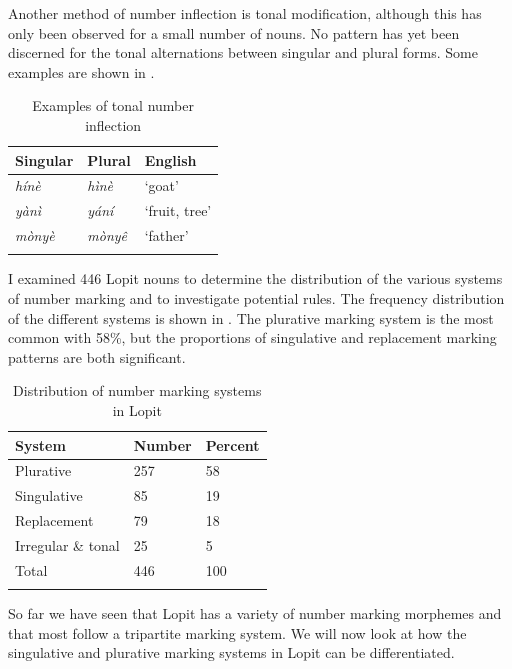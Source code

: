 \documentclass[output=paper]{langsci/langscibook}
\begin{document}
Another method of number inflection is tonal modification, although this has only been observed for a small number of nouns. No pattern has yet been discerned for the tonal alternations between singular and plural forms. Some examples are shown in .

\begin{table}
\begin{tabularx}{\textwidth}{XXX}
\lsptoprule

\mdseries \textbf{Singular} & \mdseries \textbf{Plural} & \mdseries \textbf{English}\\
\midrule
\itshape h\'{i}n\`{e} & \itshape h\`{i}n\`{e} & \mdseries ‘goat’\\
\itshape y\`{a}n\`{i} & \itshape y\'{a}n\'{i} & \mdseries ‘fruit, tree’\\
\itshape m\`{o}ny\`{e} & \itshape m\`{o}ny\^{e} & \mdseries ‘father’\\
\lspbottomrule
\end{tabularx}
\caption{Examples of tonal number inflection}
\label{tab:moodie:4}
\end{table}

I examined 446 Lopit nouns to determine the distribution of the various systems of number marking and to investigate potential rules. The frequency distribution of the different systems is shown in . The plurative marking system is the most common with 58\%, but the proportions of singulative and replacement marking patterns are both significant. 

\begin{table}
\begin{tabularx}{\textwidth}{XXX}
\lsptoprule

\mdseries \textbf{System } & \mdseries \textbf{Number} & \mdseries \textbf{Percent}\\ \midrule
Plurative & 257 & 58\\
Singulative & 85 & 19\\
Replacement & 79 & 18\\
Irregular \& tonal & 25 & 5\\
Total & 446 & 100\\
\lspbottomrule
\end{tabularx}
\caption{Distribution of number marking systems in Lopit}
\label{tab:moodie:5}
\end{table}

So far we have seen that Lopit has a variety of number marking morphemes and that most follow a tripartite marking system. We will now look at how the singulative and plurative marking systems in Lopit can be differentiated.
\end{document}
